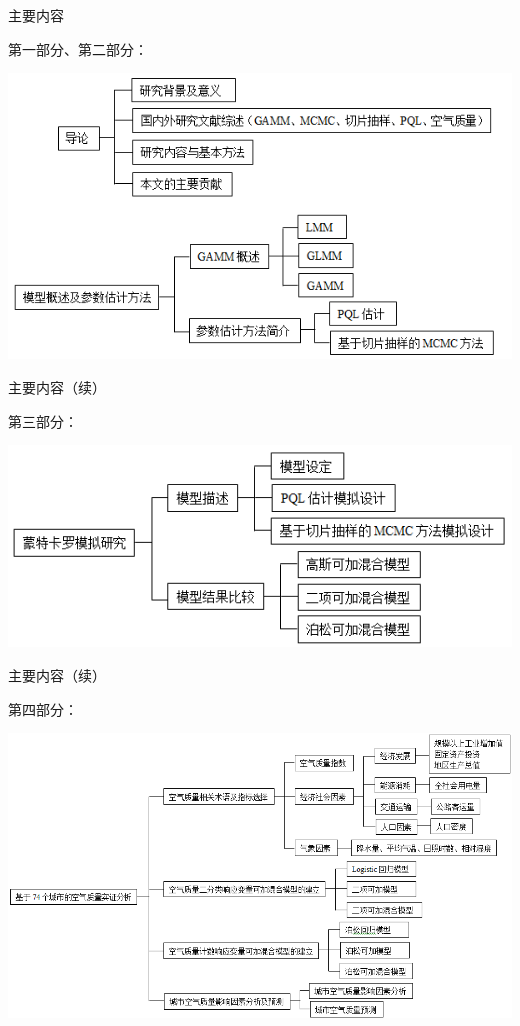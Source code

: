\documentclass[ignorenonframetext,11pt,xcolor=dvipsnames,aspectratio=1610,hyperref={bookmarksdepth=4}]{beamer}
\begin{document}
\begin{frame}{主要内容}

第一部分、第二部分：

\includegraphics[width=8.39in]{2}

\end{frame}

\begin{frame}{主要内容（续）}

第三部分：

\includegraphics[width=7.51in]{3}

\end{frame}

\begin{frame}{主要内容（续）}

第四部分：

\includegraphics[width=12.79in]{4}

\end{frame}
\end{document}
